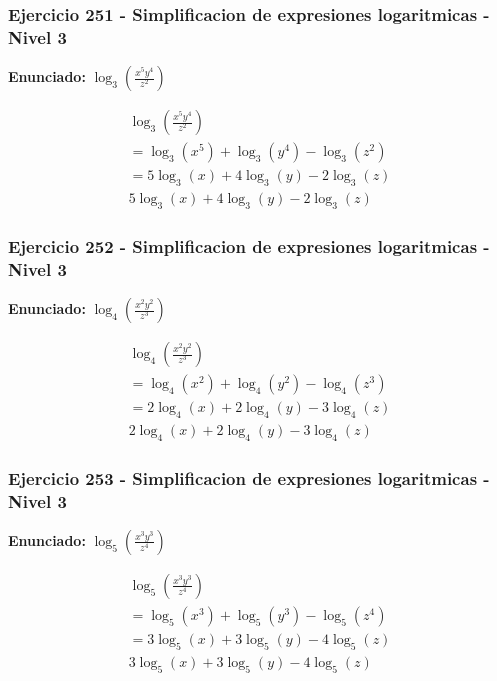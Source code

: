 \documentclass[12pt,a4paper]{article}
\begin{document}
\subsubsection*{Ejercicio 251 - Simplificacion de expresiones logaritmicas - Nivel 3}
\textbf{Enunciado:} \(\log_{3}\left(\frac{x^{5}y^{4}}{z^{2}}\right)\)

\[
\begin{aligned}
\log_{3}\left(\frac{x^{5}y^{4}}{z^{2}}\right)\\
=\log_{3}\left(x^{5}\right)+\log_{3}\left(y^{4}\right)-\log_{3}\left(z^{2}\right)\\
=5\log_{3}\left(x\right)+4\log_{3}\left(y\right)-2\log_{3}\left(z\right)\\
\boxed{5\log_{3}\left(x\right)+4\log_{3}\left(y\right)-2\log_{3}\left(z\right)}
\end{aligned}
\]


\subsubsection*{Ejercicio 252 - Simplificacion de expresiones logaritmicas - Nivel 3}
\textbf{Enunciado:} \(\log_{4}\left(\frac{x^{2}y^{2}}{z^{3}}\right)\)

\[
\begin{aligned}
\log_{4}\left(\frac{x^{2}y^{2}}{z^{3}}\right)\\
=\log_{4}\left(x^{2}\right)+\log_{4}\left(y^{2}\right)-\log_{4}\left(z^{3}\right)\\
=2\log_{4}\left(x\right)+2\log_{4}\left(y\right)-3\log_{4}\left(z\right)\\
\boxed{2\log_{4}\left(x\right)+2\log_{4}\left(y\right)-3\log_{4}\left(z\right)}
\end{aligned}
\]


\subsubsection*{Ejercicio 253 - Simplificacion de expresiones logaritmicas - Nivel 3}
\textbf{Enunciado:} \(\log_{5}\left(\frac{x^{3}y^{3}}{z^{4}}\right)\)

\[
\begin{aligned}
\log_{5}\left(\frac{x^{3}y^{3}}{z^{4}}\right)\\
=\log_{5}\left(x^{3}\right)+\log_{5}\left(y^{3}\right)-\log_{5}\left(z^{4}\right)\\
=3\log_{5}\left(x\right)+3\log_{5}\left(y\right)-4\log_{5}\left(z\right)\\
\boxed{3\log_{5}\left(x\right)+3\log_{5}\left(y\right)-4\log_{5}\left(z\right)}
\end{aligned}
\]
\end{document}
